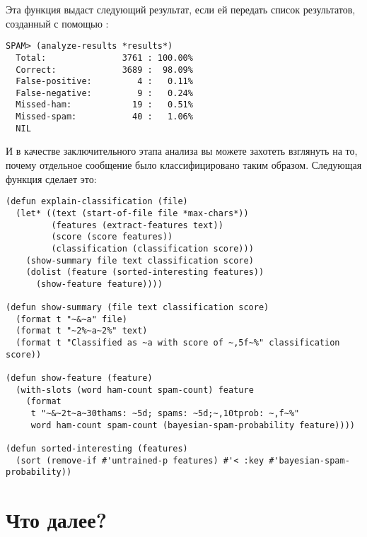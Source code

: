 Эта функция выдаст следующий результат, если ей передать список результатов, созданный с
помощью :

\begin{lstlisting}[style=lisprepl]
  SPAM> (analyze-results *results*)
  Total:               3761 : 100.00%
  Correct:             3689 :  98.09%
  False-positive:         4 :   0.11%
  False-negative:         9 :   0.24%
  Missed-ham:            19 :   0.51%
  Missed-spam:           40 :   1.06%
  NIL
\end{lstlisting}

И в качестве заключительного этапа анализа вы можете захотеть взглянуть на то, почему
отдельное сообщение было классифицировано таким образом.  Следующая функция сделает это:

\begin{lstlisting}
(defun explain-classification (file)
  (let* ((text (start-of-file file *max-chars*))
         (features (extract-features text))
         (score (score features))
         (classification (classification score)))
    (show-summary file text classification score)
    (dolist (feature (sorted-interesting features))
      (show-feature feature))))

(defun show-summary (file text classification score)
  (format t "~&~a" file)
  (format t "~2%~a~2%" text)
  (format t "Classified as ~a with score of ~,5f~%" classification score))

(defun show-feature (feature)
  (with-slots (word ham-count spam-count) feature
    (format
     t "~&~2t~a~30thams: ~5d; spams: ~5d;~,10tprob: ~,f~%"
     word ham-count spam-count (bayesian-spam-probability feature))))

(defun sorted-interesting (features)
  (sort (remove-if #'untrained-p features) #'< :key #'bayesian-spam-probability))
\end{lstlisting}

\section{Что далее?}

